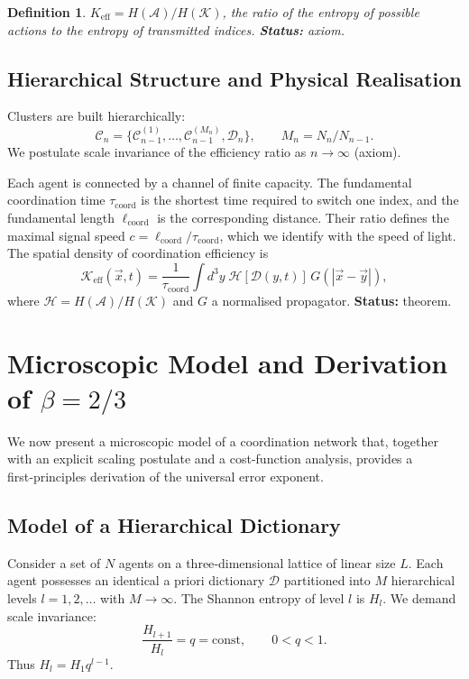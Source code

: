 \documentclass[12pt,a4paper]{article}
\newtheorem{definition}[theorem]{Definition}
\newcommand{\coord}{\mathrm{coord}}
\newcommand{\Dir}{\mathcal{D}}
\newcommand{\cC}{\mathcal{C}}
\begin{document}
	\begin{definition}
		\(K_{\mathrm{eff}} = H(\mathcal{A})/H(\mathcal{K})\), the ratio of the entropy of possible actions to the entropy of transmitted indices. \textbf{Status:} axiom.
	\end{definition}
	
	\subsection{Hierarchical Structure and Physical Realisation}
	Clusters are built hierarchically:
	\[
	\cC_n = \{\cC_{n-1}^{(1)},\dots,\cC_{n-1}^{(M_n)},\Dir_n\}, \qquad M_n = N_n/N_{n-1}.
	\]
	We postulate scale invariance of the efficiency ratio as \(n\to\infty\) (axiom).
	
	Each agent is connected by a channel of finite capacity. The fundamental coordination time \(\tau_{\coord}\) is the shortest time required to switch one index, and the fundamental length \(\ell_{\coord}\) is the corresponding distance. Their ratio defines the maximal signal speed \(c = \ell_{\coord}/\tau_{\coord}\), which we identify with the speed of light. The spatial density of coordination efficiency is
	\begin{equation}
		\mathcal{K}_{\mathrm{eff}}(\vec{x},t) = \frac{1}{\tau_{\coord}} \int d^3y\; \mathcal{H}[\Dir(y,t)]\, G(|\vec{x}-\vec{y}|),
		\label{eq:Kfield}
	\end{equation}
	where \(\mathcal{H} = H(\mathcal{A})/H(\mathcal{K})\) and \(G\) a normalised propagator. \textbf{Status:} theorem.
	
	\section{Microscopic Model and Derivation of \(\beta = 2/3\)}
	\label{sec:micro}
	
	We now present a microscopic model of a coordination network that, together with an explicit scaling postulate and a cost-function analysis, provides a first‑principles derivation of the universal error exponent.
	
	\subsection{Model of a Hierarchical Dictionary}
	Consider a set of \(N\) agents on a three‑dimensional lattice of linear size \(L\). Each agent possesses an identical a priori dictionary \(\Dir\) partitioned into \(M\) hierarchical levels \(l = 1,2,\dots\) with \(M \to \infty\). The Shannon entropy of level \(l\) is \(H_l\). We demand scale invariance:
	\begin{equation}
		\frac{H_{l+1}}{H_l} = q = \text{const}, \qquad 0 < q < 1. \label{eq:scale}
	\end{equation}
	Thus \(H_l = H_1 q^{l-1}\).
	
\end{document}

